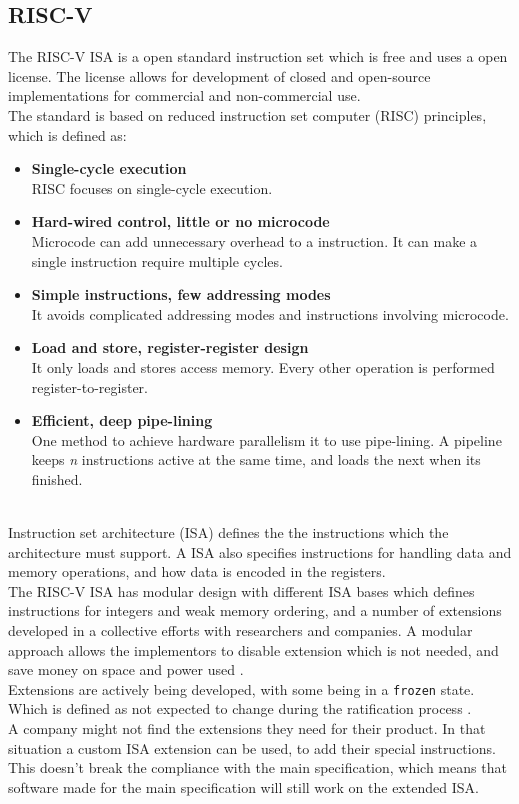 \subsection{RISC-V}
The RISC-V ISA is a open standard instruction set which is free and uses a open license. The license allows for development of closed and open-source implementations for commercial and non-commercial use.\\
The standard is based on reduced instruction set computer (RISC) principles, which is defined as:
\begin{itemize}
    \item \textbf{Single-cycle execution}\\RISC focuses on single-cycle execution.
    \item \textbf{Hard-wired control, little or no microcode}\\Microcode can add unnecessary overhead to a instruction. It can make a single instruction require multiple cycles.
    \item \textbf{Simple instructions, few addressing modes}\\It avoids complicated addressing modes and instructions involving microcode. 
    \item \textbf{Load and store, register-register design}\\It only loads and stores access memory. Every other operation is performed register-to-register.
    \item \textbf{Efficient, deep pipe-lining}\\One method to achieve hardware parallelism it to use pipe-lining. A pipeline keeps \textit{n} instructions active at the same time, and loads the next when its finished.
\end{itemize}
\\
Instruction set architecture (ISA) defines the the instructions which the architecture must support. A ISA also specifies instructions for handling data and memory operations, and how data is encoded in the registers.
\\
The RISC-V ISA has modular design with different ISA bases which defines instructions for integers and weak memory ordering, and a number of extensions developed in a collective efforts with researchers and companies.
A modular approach allows the implementors to disable extension which is not needed, and save money on space and power used \cite{extendrisc}. \\
Extensions are actively being developed, with some being in a \texttt{frozen} state. Which is defined as not expected to change during the ratification process \cite{riscmanual}.
\\
A company might not find the extensions they need for their product. In that situation a custom ISA extension can be used, to add their special instructions. 
This doesn't break the compliance with the main specification, which means that software made for the main specification will still work on the extended ISA.

